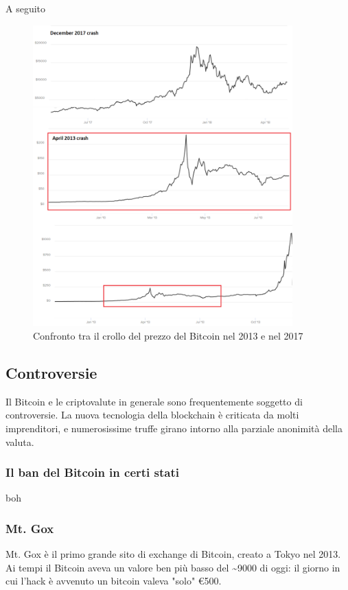 \documentclass {article}
\begin{document}
{A seguito 

\vspace {0.5cm}
\begin {figure}[h]
\includegraphics [width = 10cm] {crash2.png}
\caption {Confronto tra il crollo del prezzo del Bitcoin nel 2013 e nel 2017}
\end {figure}
\vspace {0.5cm}


\subsection {Controversie}


Il Bitcoin e le criptovalute in generale sono frequentemente soggetto di controversie. La nuova tecnologia della blockchain è criticata da molti imprenditori, e numerosissime truffe girano intorno alla parziale anonimità della valuta.


\subsubsection {Il ban del Bitcoin in certi stati}


boh


\subsubsection {Mt. Gox}


Mt. Gox è il primo grande sito di exchange di Bitcoin, creato a Tokyo nel 2013.
Ai tempi il Bitcoin aveva un valore ben più basso del \textasciitilde 9000 di oggi: il giorno in cui l'hack è avvenuto un bitcoin valeva "solo" \euro{500}.


}
\end{document}
